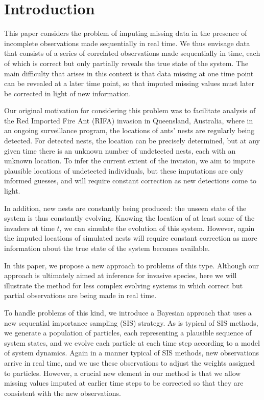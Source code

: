 \documentclass[11pt,a4paper]{article}
\begin{document}
\section{Introduction}

This paper considers the problem of imputing missing data in the presence of incomplete observations made sequentially in real time. We thus envisage data that consists of a series of correlated observations made sequentially in time, each of which is correct but only partially reveals the true state of the system. The main difficulty that arises in this context is that data missing at one time point can be revealed at a later time point, so that imputed missing values must later be corrected in light of new information.

Our original motivation for considering this problem was to facilitate analysis of the Red Imported Fire Ant (RIFA) invasion in Queensland, Australia, where in an ongoing surveillance program, the locations of ants’ nests are regularly being detected. For detected nests, the location can be precisely determined, but at any given time there is an unknown number of undetected nests, each with an unknown location. To infer the current extent of the invasion, we aim to impute plausible locations of undetected individuals, but these imputations are only informed guesses, and will require constant correction as new detections come to light.

In addition, new nests are constantly being produced: the unseen state of the system is thus constantly evolving. Knowing the location of at least some of the invaders at time $t$, we can simulate the evolution of this system. However, again the imputed locations of simulated nests will require constant correction as more information about the true state of the system becomes available.

In this paper, we propose a new approach to problems of this type. Although our approach is ultimately aimed at inference for invasive species, here we will illustrate the method for less complex evolving systems in which correct but partial observations are being made in real time.

To handle problems of this kind, we introduce a Bayesian approach that uses a new sequential importance sampling (SIS) strategy. As is typical of SIS methods, we generate a population of particles, each representing a plausible sequence of system states, and we evolve each particle at each time step according to a model of system dynamics. Again in a manner typical of SIS methods, new observations arrive in real time, and we use these observations to adjust the weights assigned to particles. However, a crucial new element in our method is that we allow missing values imputed at earlier time steps to be corrected so that they are consistent with the new observations.
\end{document}
